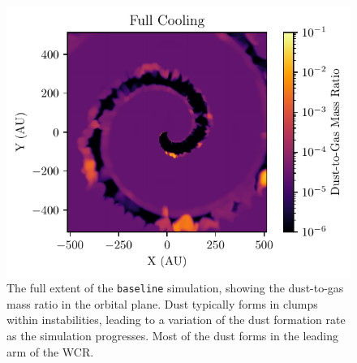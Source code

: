 \documentclass[fleqn,usenatbib]{mnras}
\begin{document}
\begin{figure}
  \centering
  \includegraphics[width=\linewidth]{assets/results/radiative/z.pdf}
  \caption[\texttt{Baseline} simulation $z$, full extent]{The full extent of the \texttt{baseline} simulation, showing the dust-to-gas mass ratio in the orbital plane. Dust typically forms in clumps within instabilities, leading to a variation of the dust formation rate as the simulation progresses. Most of the dust forms in the leading arm of the WCR.}
  \label{fig:full-radiative-z}
\end{figure}



\end{document}
